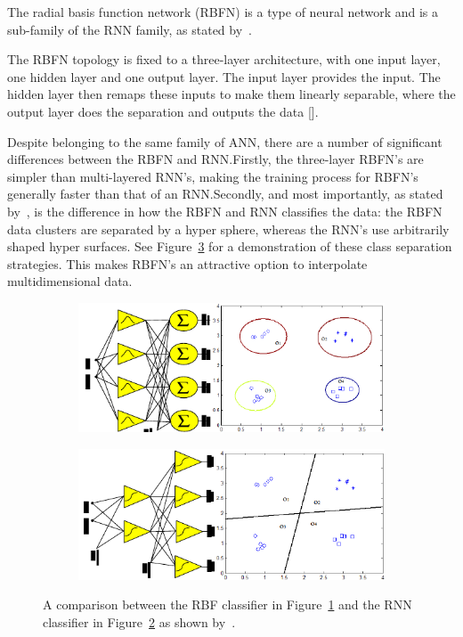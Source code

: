 The radial basis function network (RBFN) is a type of neural network and is a sub-family of the RNN family, as stated by~\cite{wilamowski1996implementation}. 

The RBFN topology is fixed to a three-layer architecture, with one input layer, one hidden layer and one output layer. The input layer provides the input. The hidden layer then remaps these inputs to make them linearly separable, where the output layer does the separation and outputs the data [\cite{xie2011comparison}].  

Despite belonging to the same family of ANN, there are a number of significant differences between the RBFN and RNN.\@ Firstly, the three-layer RBFN's are simpler than multi-layered RNN's, making the training process for RBFN's generally faster than that of an RNN.\@ Secondly, and most importantly, as stated by~\citeauthor{xie2011comparison}, is the difference in how the RBFN and RNN classifies the data: the RBFN data clusters are separated by a hyper sphere, whereas the RNN's use arbitrarily shaped hyper surfaces. See Figure~\ref{fig:chap2-classifier} for a demonstration of these class separation strategies. This makes RBFN's an attractive option to interpolate multidimensional data.

\begin{figure}
  \centering
  \begin{subfigure}{0.5\textwidth}
    \includegraphics[width=\textwidth]{figures/chapter2/rbf_class}
    \caption{}
    \label{fig:chap2-rbf-classifier}
  \end{subfigure}
  \begin{subfigure}{0.5\textwidth}
    \includegraphics[width=\textwidth]{figures/chapter2/rnn_class}
    \caption{}
    \label{fig:chap2-rnn-classifier}
  \end{subfigure}
  \caption[A comparison between the RBF and RNN classifiers. ]{A comparison between the RBF classifier in Figure~\ref{fig:chap2-rbf-classifier} and the RNN classifier in Figure~\ref{fig:chap2-rnn-classifier} as shown by~\cite{xie2011comparison}. }
\label{fig:chap2-classifier}
\end{figure}

